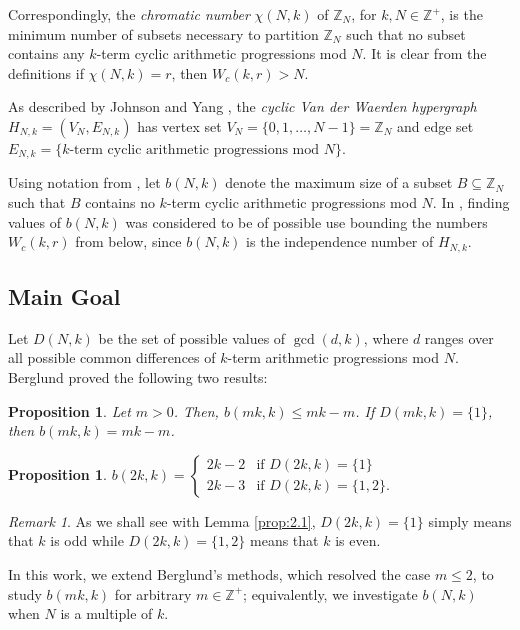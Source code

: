 \documentclass{article}
\newtheorem{proposition}[theorem]{Proposition}
\theoremstyle{definition}
\theoremstyle{remark}
\newtheorem*{remark}{Remark}
\begin{document}
Correspondingly, the \textit{chromatic number} $\chi(N,k)$ of $\mathbb{Z}_N$, for $k,N \in \mathbb{Z}^+$, is the minimum number of subsets necessary to partition $\mathbb{Z}_{N}$ such that no subset contains any $k$-term cyclic arithmetic progressions mod $N$. It is clear from the definitions if $\chi(N,k) = r$, then $W_c(k,r) > N$.

As described by Johnson and Yang \cite{Yang}, the \textit{cyclic Van der Waerden hypergraph} $H_{N,k} = (V_{N},E_{N,k})$ has vertex set $V_{N} = \{0,1,\ldots,N-1\} = \mathbb{Z}_{N}$ and edge set \\ $E_{N,k} =\{k\text{-term cyclic arithmetic progressions mod }N\}$.

Using notation from \cite{Berglund}, let $b(N,k)$ denote the maximum size of a subset $B \subseteq \mathbb{Z}_{N}$ such that $B$ contains no $k$-term cyclic arithmetic progressions mod $N$. In \cite{Johnson}, finding values of $b(N,k)$ was considered to be of possible use bounding the numbers $W_{c}(k,r)$ from below, since $b(N,k)$ is the independence number of $H_{N,k}$. 

\subsection{Main Goal}

Let $D(N,k)$ be the set of possible values of $\gcd(d,k)$, where $d$ ranges over all possible common differences of $k$-term arithmetic progressions mod $N$. Berglund \cite{Berglund} proved the following two results:

\begin{proposition}
    Let $m > 0$. Then, $b(mk,k) \leq mk-m$. If $D(mk,k) = \{1\}$, then $b(mk,k) = mk-m$.
\end{proposition}

\begin{proposition}
    $b(2k,k) = \begin{cases}
        2k-2 & \text{if $D(2k,k) = \{1\}$} \\
        2k-3 & \text{if $D(2k,k) = \{1,2\}$}.
    \end{cases}$
\end{proposition}

\begin{remark}
    As we shall see with Lemma \ref{prop:2.1}, $D(2k,k) = \{1\}$ simply means that $k$ is odd while $D(2k,k) = \{1,2\}$ means that $k$ is even.
\end{remark}

In this work, we extend Berglund's methods, which resolved the case $m \leq 2$, to study $b(mk,k)$ for arbitrary $m \in \mathbb{Z}^+$; equivalently, we investigate $b(N,k)$ when $N$ is a multiple of $k$. 
\end{document}
